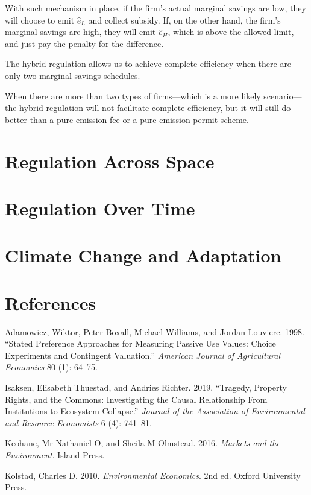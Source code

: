 \documentclass[
]{book}
\begin{document}
With such mechanism in place, if the firm's actual marginal savings are low, they will choose to emit \(\hat{e}_L\) and collect subsidy. If, on the other hand, the firm's marginal savings are high, they will emit \(\hat{e}_H\), which is above the allowed limit, and just pay the penalty for the difference.

The hybrid regulation allows us to achieve complete efficiency when there are only two marginal savings schedules.

When there are more than two types of firms---which is a more likely scenario---the hybrid regulation will not facilitate complete efficiency, but it will still do better than a pure emission fee or a pure emission permit scheme.

\hypertarget{regulation-across-space}{%
\chapter{Regulation Across Space}\label{regulation-across-space}}

\hypertarget{regulation-over-time}{%
\chapter{Regulation Over Time}\label{regulation-over-time}}

\hypertarget{climate-change-and-adaptation}{%
\chapter{Climate Change and Adaptation}\label{climate-change-and-adaptation}}

\hypertarget{references}{%
\chapter*{References}\label{references}}

\hypertarget{refs}{}
\leavevmode\hypertarget{ref-adamowicz1998}{}%
Adamowicz, Wiktor, Peter Boxall, Michael Williams, and Jordan Louviere. 1998. ``Stated Preference Approaches for Measuring Passive Use Values: Choice Experiments and Contingent Valuation.'' \emph{American Journal of Agricultural Economics} 80 (1): 64--75.

\leavevmode\hypertarget{ref-isaksen2019}{}%
Isaksen, Elisabeth Thuestad, and Andries Richter. 2019. ``Tragedy, Property Rights, and the Commons: Investigating the Causal Relationship From Institutions to Ecosystem Collapse.'' \emph{Journal of the Association of Environmental and Resource Economists} 6 (4): 741--81.

\leavevmode\hypertarget{ref-keohane2016}{}%
Keohane, Mr Nathaniel O, and Sheila M Olmstead. 2016. \emph{Markets and the Environment}. Island Press.

\leavevmode\hypertarget{ref-kolstad2010}{}%
Kolstad, Charles D. 2010. \emph{Environmental Economics}. 2nd ed. Oxford University Press.
\end{document}
